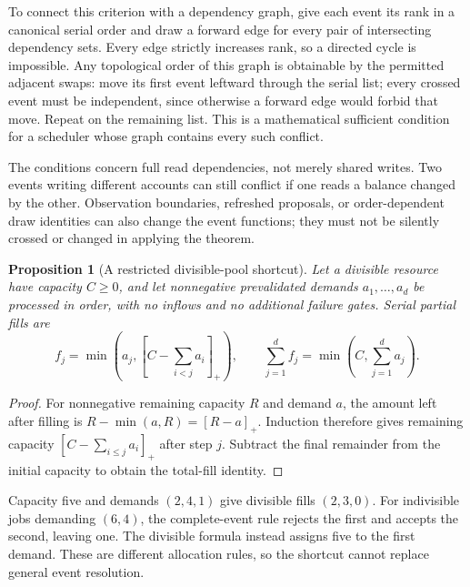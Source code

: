 \documentclass[11pt,a4paper]{article}
\newtheorem{proposition}[theorem]{Proposition}
\begin{document}
To connect this criterion with a dependency graph, give each event its rank in a canonical serial order and draw a forward edge for every pair of intersecting dependency sets. Every edge strictly increases rank, so a directed cycle is impossible. Any topological order of this graph is obtainable by the permitted adjacent swaps: move its first event leftward through the serial list; every crossed event must be independent, since otherwise a forward edge would forbid that move. Repeat on the remaining list. This is a mathematical sufficient condition for a scheduler whose graph contains every such conflict.

The conditions concern full read dependencies, not merely shared writes. Two events writing different accounts can still conflict if one reads a balance changed by the other. Observation boundaries, refreshed proposals, or order-dependent draw identities can also change the event functions; they must not be silently crossed or changed in applying the theorem.

\begin{proposition}[A restricted divisible-pool shortcut]
Let a divisible resource have capacity $C\geq0$, and let nonnegative prevalidated demands $a_1,\ldots,a_d$ be processed in order, with no inflows and no additional failure gates. Serial partial fills are
\begin{equation}
f_j=\min\left(a_j,\left[C-\sum_{i<j}a_i\right]_+\right),
\qquad \sum_{j=1}^{d}f_j=\min\left(C,\sum_{j=1}^{d}a_j\right).
\end{equation}
\end{proposition}
\begin{proof}
For nonnegative remaining capacity $R$ and demand $a$, the amount left after filling is $R-\min(a,R)=[R-a]_+$. Induction therefore gives remaining capacity $[C-\sum_{i\leq j}a_i]_+$ after step $j$. Subtract the final remainder from the initial capacity to obtain the total-fill identity.
\end{proof}

Capacity five and demands $(2,4,1)$ give divisible fills $(2,3,0)$. For indivisible jobs demanding $(6,4)$, the complete-event rule rejects the first and accepts the second, leaving one. The divisible formula instead assigns five to the first demand. These are different allocation rules, so the shortcut cannot replace general event resolution.
\end{document}
